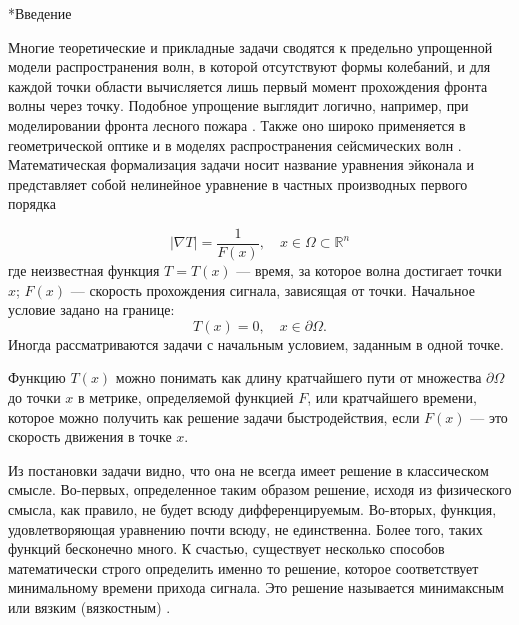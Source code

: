 \documentclass[a4paper,12pt]{article}
\makeatletter
\renewcommand{\section}{\@startsection{section}{1}{0cm}{-3.5ex plus -1ex minus -.2ex}{2.3ex plus.2ex}{\raggedright\normalfont}}
\makeatother
\begin{document}
\large
\setcounter{page}{4}

\tableofcontents
\pagebreak
\section*{Введение}
\label{intro}

Многие теоретические и прикладные задачи сводятся к предельно
упрощенной модели распространения волн, в которой отсутствуют формы
колебаний, и для каждой точки области вычисляется лишь первый момент
прохождения фронта волны через точку. Подобное упрощение выглядит
логично, например, при моделировании фронта лесного пожара
\cite{S1999}.  Также оно широко применяется в геометрической оптике и
в моделях распространения сейсмических волн \cite{I2005, N2015,B2006, W1969}.
Математическая формализация задачи носит название уравнения эйконала и
представляет собой нелинейное уравнение в частных производных первого
порядка

$$|\nabla T| = \frac{1}{F(x)}, \quad x \in \Omega \subset \mathbb{R}^n$$
где неизвестная функция $T=T(x)$ --- время, за которое волна достигает
точки $x$; $F(x)$ --- скорость прохождения сигнала, зависящая от
точки. Начальное условие задано на границе:
$$ T(x) = 0, \quad x \in \partial \Omega. $$
Иногда рассматриваются задачи с начальным условием, заданным в одной
точке.

Функцию $T(x)$ можно понимать как длину кратчайшего пути от множества
$\partial \Omega$ до точки $x$ в метрике, определяемой функцией $F$,
или кратчайшего времени, которое можно получить как решение задачи
быстродействия, если $F(x)$ --- это скорость движения в точке $x$.

Из постановки задачи видно, что она не всегда имеет решение в
классическом смысле. Во-первых, определенное таким образом решение,
исходя из физического смысла, как правило, не будет всюду
дифференцируемым. Во-вторых, функция, удовлетворяющая уравнению почти
всюду, не единственна. Более того, таких функций бесконечно много. К
счастью, существует несколько способов математически строго определить
именно то решение, которое соответствует минимальному времени прихода
сигнала. Это решение называется минимаксным или вязким (вязкостным)
\cite{V1983, V1984}. 
\end{document}
